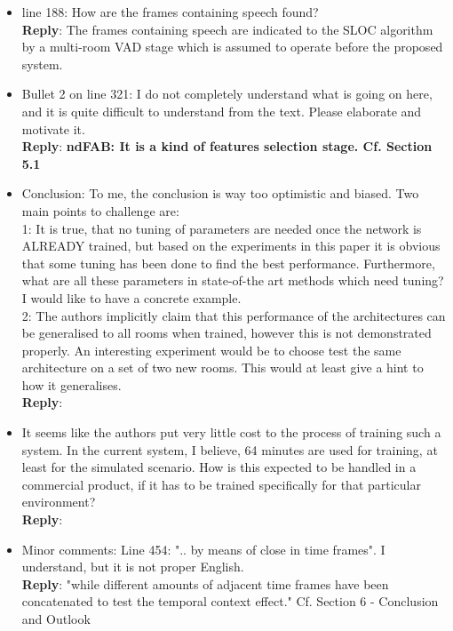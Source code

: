 \documentclass[11pt, technote, letterpaper, oneside, onecolumn]{IEEEtran}
\begin{document}
\begin{itemize}
\item line 188: How are the frames containing speech found?\\
\textbf{Reply}: The frames containing speech are indicated to the SLOC algorithm by a multi-room VAD stage which is assumed to operate before the proposed system.

\item Bullet 2 on line 321: I do not completely understand what is going on here, and it is quite difficult to understand from the text. Please elaborate and motivate it.\\
\textbf{Reply}: \textbf{ndFAB: It is a kind of features selection stage. Cf. Section 5.1}

\item Conclusion: To me, the conclusion is way too optimistic and biased. Two main points to challenge are:\\
 1: It is true, that no tuning of parameters are needed once the network is ALREADY trained, but based on the experiments in this paper it is obvious that some tuning has been done to find the best performance. Furthermore, what are all these parameters in state-of-the art methods which need tuning? I would like to have a concrete example.\\
 2: The authors implicitly claim that this performance of the architectures can be generalised to all rooms when trained, however this is not demonstrated properly. An interesting experiment would be to choose test the same architecture on a set of two new rooms. This would at least give a hint to how it generalises.\\
 \textbf{Reply}:

\item It seems like the authors put very little cost to the process of training such a system. In the current system, I believe, 64 minutes are used for training, at least for the simulated scenario. How is this expected to be handled in a commercial product, if it has to be trained specifically for that particular environment?\\
\textbf{Reply}:

\item Minor comments: Line 454: ".. by means of close in time frames". I understand, but it is not proper English.\\
\textbf{Reply}: "while different amounts of adjacent time frames have been concatenated to test the temporal context effect." Cf. Section 6 - Conclusion and Outlook
\end{itemize}
\end{document}
